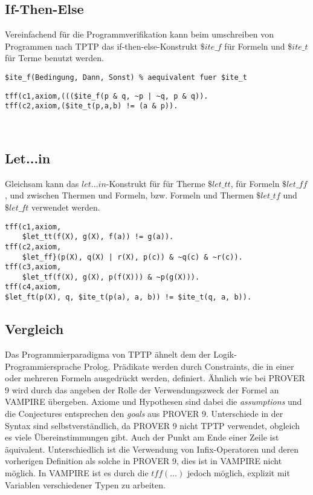 \documentclass{article}
\begin{document}
\subsection{If-Then-Else}
\label{subsec:tptpitef}

Vereinfachend für die Programmverifikation kann beim umschreiben von Programmen nach TPTP das if-then-else-Konstrukt $ \$ite\_f $ für Formeln und $\$ite\_t$ für Terme benutzt werden.
\begin{lstlisting}[language=tptp]
$ite_f(Bedingung, Dann, Sonst) % aequivalent fuer $ite_t
\end{lstlisting}
\begin{lstlisting}[language=tptp]
tff(c1,axiom,((($ite_f(p & q, ~p | ~q, p & q)).
tff(c2,axiom,($ite_t(p,a,b) != (a & p)).
\end{lstlisting}
~\cite{hoder2011slides}
\subsection{Let...in}
\label{subsec:tptpletin}

Gleichsam kann das $let\dots in$-Konstrukt für für Therme $\$let\_tt$, für Formeln $\$let\_ff$, und zwischen Thermen und Formeln, bzw. Formeln und Thermen $\$let\_tf$ und $\$let\_ft$ verwendet werden.
\begin{lstlisting}[language=tptp]
tff(c1,axiom,
	$let_tt(f(X), g(X), f(a)) != g(a)).
tff(c2,axiom,
	$let_ff}(p(X), q(X) | r(X), p(c)) & ~q(c) & ~r(c)).
tff(c3,axiom,
	$let_tf(f(X), g(X), p(f(X))) & ~p(g(X))).
tff(c4,axiom,
$let_ft(p(X), q, $ite_t(p(a), a, b)) != $ite_t(q, a, b)).
\end{lstlisting}
\subsection{Vergleich}
\label{subsec:tptpcomp}
Das Programmierparadigma von TPTP ähnelt dem der Logik-Programmiersprache Prolog.
Prädikate werden durch Constraints, die in einer oder mehreren Formeln ausgedrückt werden, definiert.
Ähnlich wie bei PROVER 9 wird durch das angeben der Rolle der Verwendungszweck der Formel an VAMPIRE übergeben. Axiome und Hypothesen sind dabei die \textit{assumptions} und die Conjectures entsprechen den \textit{goals} aus PROVER 9.
Unterschiede in der Syntax sind selbstverständlich, da PROVER 9 nicht TPTP verwendet, obgleich es viele Übereinstimmungen gibt.
Auch der Punkt am Ende einer Zeile ist äquivalent. Unterschiedlich ist die Verwendung von Infix-Operatoren und deren vorherigen Definition als solche in PROVER 9, 
dies ist in VAMPIRE nicht möglich. In VAMPIRE ist es durch die $tff(\dots)$ jedoch möglich, explizit mit Variablen verschiedener Typen zu arbeiten.\cite{cav2013, prover9manual} 
\end{document}
